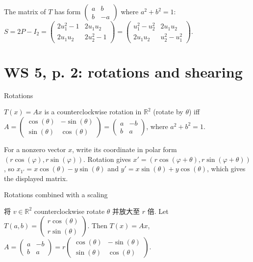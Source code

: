 The matrix of \(T\) has form \(\begin{pmatrix}
a & b \\
b & {- a}
\end{pmatrix}\) where \(a^{2} + b^{2} = 1\): \(S = 2P - I_{2} = \begin{pmatrix}
{2u_{1}^{2} - 1} & {2u_{1}u_{2}} \\
{2u_{1}u_{2}} & {2u_{2}^{2} - 1}
\end{pmatrix} = \begin{pmatrix}
{u_{1}^{2} - u_{2}^{2}} & {2u_{1}u_{2}} \\
{2u_{1}u_{2}} & {u_{2}^{2} - u_{1}^{2}}
\end{pmatrix}\).

\section{WS 5, p. 2: rotations and shearing}

\begin{theorem}{Rotations}

\(T(x) = Ax\) is a counterclockwise rotation in \(\mathbb{R}^{2}\) (rotate by \(\theta\)) iff \(A = \begin{pmatrix}
{\cos(\theta)} & {- \sin(\theta)} \\
{\sin(\theta)} & {\cos(\theta)}
\end{pmatrix} = \begin{pmatrix}
a & {- b} \\
b & a
\end{pmatrix}\), where \(a^{2} + b^{2} = 1\).

\end{theorem}

For a nonzero vector \(x\), write its coordinate in polar form \(\left( {r\cos(\varphi),r\sin(\varphi)} \right)\). Rotation gives \(x' = \left( {r\cos\left( {\varphi + \theta} \right),r\sin\left( {\varphi + \theta} \right)} \right)\), so \(x_{1'} = x\cos(\theta) - y\sin(\theta)\) and \(y' = x\sin(\theta) + y\cos(\theta)\), which gives the displayed matrix.

\begin{theorem}{Rotations combined with a scaling}

将 \(v \in \mathbb{R}^{2}\) counterclockwise rotate \(\theta\) 并放大至 \(r\) 倍. Let \(T\left( {a,b} \right) = \begin{pmatrix}
{r\cos(\theta)} \\
{r\sin(\theta)}
\end{pmatrix}\). Then \(T(x) = Ax\), \(A = \begin{pmatrix}
a & {- b} \\
b & a
\end{pmatrix} = r\begin{pmatrix}
{\cos(\theta)} & {- \sin(\theta)} \\
{\sin(\theta)} & {\cos(\theta)}
\end{pmatrix}\).

\end{theorem}


